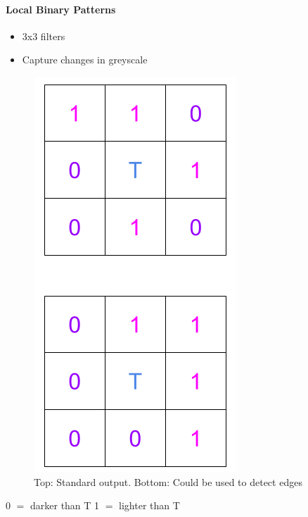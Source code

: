 \documentclass[paper=a4, fontsize=11pt]{article} %
\numberwithin{equation}{section} %
\numberwithin{figure}{section} %
\numberwithin{table}{section} %
\begin{document}
\paragraph{Local Binary Patterns}

\begin{itemize}
\item 3x3 filters
\item Capture changes in greyscale
\end{itemize}

\begin{figure}[h]
    \centering
\includegraphics[scale=0.3]{images/local_binary}
\caption{Top: Standard output. Bottom: Could be used to detect edges}
    \label{fig:local_binary}
\end{figure}

0 $=$ darker than T
1 $=$ lighter than T
\end{document}
